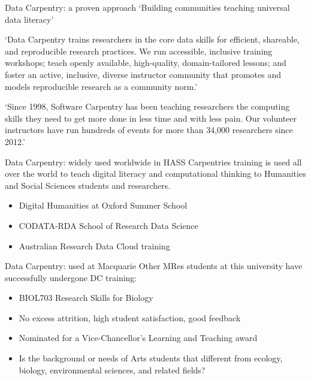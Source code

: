 \documentclass[aspectratio=169, 11pt]{beamer} %
\begin{document}
\begin{frame}{Data Carpentry: a proven approach}
    `Building communities teaching universal data literacy'  %
       
    `Data Carpentry trains researchers in the core data skills for efficient, shareable, and reproducible research practices. We run accessible, inclusive training workshops; teach openly available, high-quality, domain-tailored lessons; and foster an active, inclusive, diverse instructor community that promotes and models reproducible research as a community norm.' \cite{Teal2016-gy}

    `Since 1998, Software Carpentry has been teaching researchers the computing skills they need to get more done in less time and with less pain. Our volunteer instructors have run hundreds of events for more than 34,000 researchers since 2012.' \cite{Duckles2018-fu}
\end{frame}

\begin{frame}{Data Carpentry: widely used worldwide in HASS}
    Carpentries training is used all over the world to teach digital literacy and computational thinking to Humanities and Social Sciences students and researchers.
    \begin{itemize}[label=\textbullet]
        \item Digital Humanities at Oxford Summer School
        \item CODATA-RDA School of Research Data Science
        \item Australian Research Data Cloud training
    \end{itemize}
\end{frame}

\begin{frame}{Data Carpentry: used at Macquarie}
  Other MRes students at this university have successfully undergone DC training:
    \begin{itemize}[label=\textbullet]
        \item BIOL703 Research Skills for Biology
        \item No excess attrition, high student satisfaction, good feedback
        \item Nominated for a Vice-Chancellor's Learning and Teaching award
        \item Is the background or needs of Arts students that different from ecology, biology, environmental sciences, and related fields?
    \end{itemize}
\end{frame}
\end{document}
